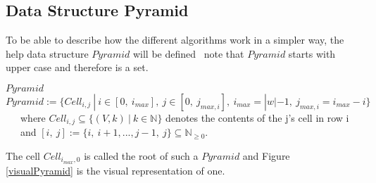 \subsection{Data Structure Pyramid} \label{dataStructurePyramid}
To be able to describe how the different algorithms work in a simpler way, the help data structure $Pyramid$ will be defined \textendash~note that $Pyramid$ starts with upper case and therefore is a set.
\begin{DefGrey} \textbf{$Pyramid$} \\
	$Pyramid :=\{ Cell_{i,j}\ |\ i \in [0,\ i_{max}],\  j \in [0,\ j_{max,i}],\ i_{max} = |w|-1,~j_{max,i} = i_{max} -i\}$\\
	~~~where $Cell_{i,j} \subseteq \{(V,k)~|~k \in \mathbb{N} \}$ denotes the contents of the j's cell in row i\\
	~~~and $[i,\ j] := \{i,\ i+1,..., j-1,\ j\} \subseteq \mathbb{N}_{\geq 0}$.
\end{DefGrey}
\noindent The cell $Cell_{i_{max},0}$ is called the root of such a $Pyramid$ and Figure \ref{visualPyramid} is the visual representation of one.
\newcommand{\boxpyramid}[1]{
	\fontsize{5}{12}\selectfont{#1}
}
